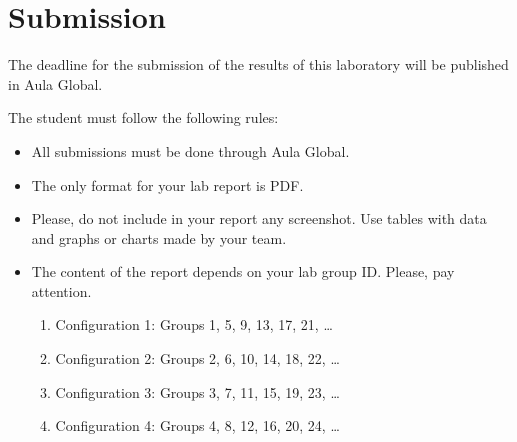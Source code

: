 \clearpage
\section{Submission}

The deadline for the submission of the results of this laboratory 
will be published in Aula Global.

The student must follow the following rules:

\begin{itemize}

  \item All submissions must be done through Aula Global.

  \item The only format for your lab report is PDF.

  \item Please, do not include in your report any screenshot.
        Use tables with data and graphs or charts made by your team.

  \item The content of the report depends on your lab group ID.
        Please, pay attention.
  \begin{enumerate}
    \item Configuration 1: Groups 1, 5, 9, 13, 17, 21, \ldots
    \item Configuration 2: Groups 2, 6, 10, 14, 18, 22, \ldots
    \item Configuration 3: Groups 3, 7, 11, 15, 19, 23, \ldots
    \item Configuration 4: Groups 4, 8, 12, 16, 20, 24, \ldots
  \end{enumerate}


\end{itemize}
